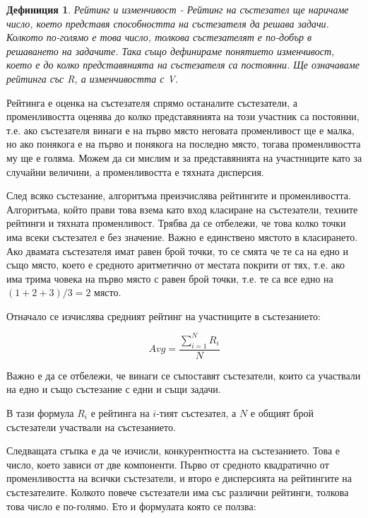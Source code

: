 \documentclass[a4paper,12pt]{article}
\begin{document}
  \newtheorem{rating_definition}{Дефиниция}
  \begin{rating_definition}
    Рейтинг и изменчивост - \emph{Рейтинг} на състезател ще наричаме число, което представя способността на състезателя да решава задачи. Колкото по-голямо е това число, толкова състезателят е по-добър в решаването на задачите. Така също дефинираме понятието \emph{изменчивост}, което е до колко представянията на състезателя са постоянни. Ще означаваме рейтинга със R, а изменчивостта с V.
  \end{rating_definition}
  
  Рейтинга е оценка на състезателя спрямо останалите състезатели, а променливостта оценява до колко представянията на този участник са постоянни, т.е. ако състезателя винаги е на първо място неговата променливост ще е малка, но ако понякога е на първо и понякога на последно място, тогава променливостта му ще е голяма. Можем да си мислим и за представянията на участниците като за случайни величини, а променливостта е тяхната дисперсия.
  
  След всяко състезание, алгоритъма преизчислява рейтингите и променливостта. Алгоритъма, който прави това взема като вход класиране на състезатели, техните рейтинги и тяхната променливост. Трябва да се отбележи, че това колко точки има всеки състезател е без значение. Важно е единствено мястото в класирането. Ако двамата състезателя имат равен брой точки, то се смята че те са на едно и също място, което е средното аритметично от местата покрити от тях, т.е. ако има трима човека на първо място с равен брой точки, т.е. те са все едно на \((1 + 2 + 3) / 3 = 2\) място.
  
  Отначало се изчислява средният рейтинг на участниците в състезанието:
  
  \begin{equation} \label{eq:ave_rating}
    Avg = \frac{\sum\limits_{i=1}^{N} R_{i}}{N}
  \end{equation}
  
  Важно е да се отбележи, че винаги се съпоставят състезатели, които са участвали на едно и също състезание с едни и същи задачи.
  
  В тази формула \(R_i\) е рейтинга на \(i\)-тият състезател, а \(N\) е общият брой състезатели участвали на състезанието.
  
  Следващата стъпка е да че изчисли, конкурентността на състезанието. Това е число, което зависи от две компоненти. Първо от средното квадратично от променливостта на всички състезатели, и второ е дисперсията на рейтингите на състезателите. Колкото повече състезатели има със различни рейтинги, толкова това число е по-голямо. Ето и формулата която се ползва: 
  
\end{document}
